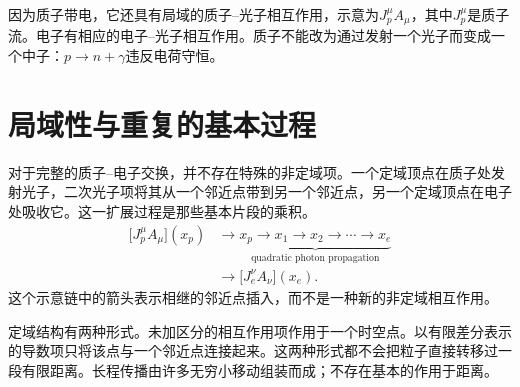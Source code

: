 因为质子带电，它还具有局域的质子--光子相互作用，示意为\(J_p^\mu A_\mu\)，其中\(J_p^\mu\)是质子流。电子有相应的电子--光子相互作用。质子不能改为通过发射一个光子而变成一个中子：\(p\to n+\gamma\)违反电荷守恒。

\begin{classroomqa}
\end{classroomqa}

\section{局域性与重复的基本过程}

对于完整的质子--电子交换，并不存在特殊的非定域项。一个定域顶点在质子处发射光子，二次光子项将其从一个邻近点带到另一个邻近点，另一个定域顶点在电子处吸收它。这一扩展过程是那些基本片段的乘积。
\begin{equation}
\begin{aligned}
\bigl[J_p^\mu A_\mu\bigr](x_p)
&\longrightarrow
\underbrace{x_p\to x_1\to x_2\to\cdots\to x_e}_{\text{quadratic photon propagation}}
\\
&\longrightarrow
\bigl[J_e^\nu A_\nu\bigr](x_e).
\end{aligned}
\end{equation}
这个示意链中的箭头表示相继的邻近点插入，而不是一种新的非定域相互作用。

\begin{classroomqa}
\end{classroomqa}

定域结构有两种形式。未加区分的相互作用项作用于一个时空点。以有限差分表示的导数项只将该点与一个邻近点连接起来。这两种形式都不会把粒子直接转移过一段有限距离。长程传播由许多无穷小移动组装而成；不存在基本的作用于距离。

\begin{classroomqa}
\end{classroomqa}

